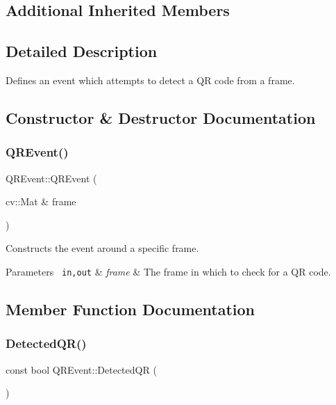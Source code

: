 \subsection*{Additional Inherited Members}


\subsection{Detailed Description}
Defines an event which attempts to detect a QR code from a frame. 

\subsection{Constructor \& Destructor Documentation}
\mbox{\label{class_q_r_event_aacf861110c0a1c3543dee2a6a6aefad1}} 
\subsubsection{\texorpdfstring{QREvent()}{QREvent()}}
{\footnotesize\ttfamily Q\+R\+Event\+::\+Q\+R\+Event (\begin{DoxyParamCaption}\item[{cv\+::\+Mat \&}]{frame }\end{DoxyParamCaption})}

Constructs the event around a specific frame. 
\begin{DoxyParams}[1]{Parameters}
\mbox{\texttt{ in,out}}  & {\em frame} & The frame in which to check for a QR code. \\
\hline
\end{DoxyParams}


\subsection{Member Function Documentation}
\mbox{\label{class_q_r_event_acd6618cf30bb95242115eb0c99073c72}} 
\subsubsection{\texorpdfstring{DetectedQR()}{DetectedQR()}}
{\footnotesize\ttfamily const bool Q\+R\+Event\+::\+Detected\+QR (\begin{DoxyParamCaption}{ }\end{DoxyParamCaption})}

